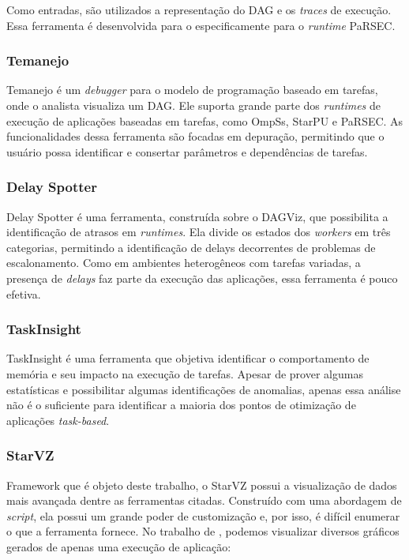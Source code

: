 \documentclass[prop-esp]{iiufrgs}
\begin{document}
Como entradas, são utilizados a representação do DAG e os \emph{traces} de execução. Essa ferramenta é desenvolvida para o especificamente para o \emph{runtime} PaRSEC.

\subsubsection*{Temanejo}

Temanejo \cite{ref:temanejo} é um \emph{debugger} para o modelo de programação baseado em tarefas, onde o analista visualiza um DAG. Ele suporta grande parte dos 
\emph{runtimes} de execução de aplicações baseadas em tarefas, como OmpSs, StarPU e PaRSEC. As funcionalidades dessa ferramenta são focadas em depuração, permitindo que o usuário possa identificar e consertar parâmetros e dependências de tarefas.

\subsubsection*{Delay Spotter}

Delay Spotter \cite{ref:delayspotter} é uma ferramenta, construída sobre o DAGViz, que possibilita a identificação de atrasos em \emph{runtimes}.
Ela divide os estados dos \emph{workers} em três categorias, permitindo a identificação de delays decorrentes de problemas de escalonamento.
Como em ambientes heterogêneos com tarefas variadas, a presença de \emph{delays} faz parte da execução das aplicações, essa ferramenta é pouco efetiva.

\subsubsection*{TaskInsight}

TaskInsight \cite{ref:taskinsight} é uma ferramenta que objetiva identificar o comportamento de memória e seu impacto na execução de tarefas. 
Apesar de prover algumas estatísticas e possibilitar algumas identificações de anomalias, apenas essa análise não é o suficiente para
identificar a maioria dos pontos de otimização de aplicações \emph{task-based}.

\subsubsection*{StarVZ}

Framework que é objeto deste trabalho, o StarVZ \cite{ref:starvz} possui a visualização de dados mais avançada dentre as ferramentas citadas.
Construído com uma abordagem de \emph{script}, ela possui um grande poder de customização e, por isso, é difícil enumerar o que a ferramenta fornece.
No trabalho de \citet{ref:starvz}, podemos visualizar diversos gráficos gerados de apenas uma execução de aplicação:
\end{document}
